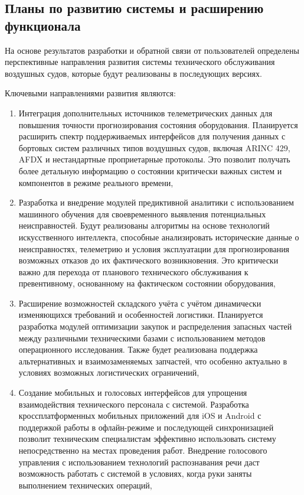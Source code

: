 \documentclass[14pt,a4paper]{extarticle}
\begin{document}
\subsection{Планы по развитию системы и расширению функционала}

На основе результатов разработки и обратной связи от пользователей определены перспективные направления развития системы технического обслуживания воздушных судов, которые будут реализованы в последующих версиях.

Ключевыми направлениями развития являются:

\begin{enumerate}
\item Интеграция дополнительных источников телеметрических данных для повышения точности прогнозирования состояния оборудования. Планируется расширить спектр поддерживаемых интерфейсов для получения данных с бортовых систем различных типов воздушных судов, включая ARINC 429, AFDX и нестандартные проприетарные протоколы. Это позволит получать более детальную информацию о состоянии критически важных систем и компонентов в режиме реального времени,

\item Разработка и внедрение модулей предиктивной аналитики с использованием машинного обучения для своевременного выявления потенциальных неисправностей. Будут реализованы алгоритмы на основе технологий искусственного интеллекта, способные анализировать исторические данные о неисправностях, телеметрию и условия эксплуатации для прогнозирования возможных отказов до их фактического возникновения. Это критически важно для перехода от планового технического обслуживания к превентивному, основанному на фактическом состоянии оборудования,

\item Расширение возможностей складского учёта с учётом динамически изменяющихся требований и особенностей логистики. Планируется разработка модулей оптимизации закупок и распределения запасных частей между различными техническими базами с использованием методов операционного исследования. Также будет реализована поддержка альтернативных и взаимозаменяемых запчастей, что особенно актуально в условиях возможных логистических ограничений,

\item Создание мобильных и голосовых интерфейсов для упрощения взаимодействия технического персонала с системой. Разработка кроссплатформенных мобильных приложений для iOS и Android с поддержкой работы в офлайн-режиме и последующей синхронизацией позволит техническим специалистам эффективно использовать систему непосредственно на местах проведения работ. Внедрение голосового управления с использованием технологий распознавания речи даст возможность работать с системой в условиях, когда руки заняты выполнением технических операций,


\end{enumerate}
\end{document}
